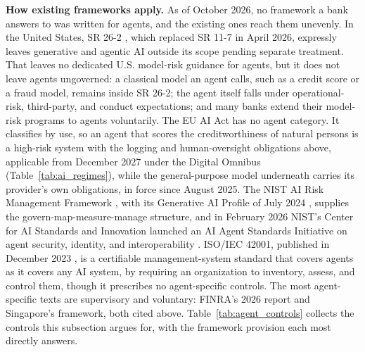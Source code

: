 \documentclass[../ai_in_finance]{subfiles}
\begin{document}
\textbf{How existing frameworks apply.} As of October 2026, no framework a bank answers to was written for agents, and the existing ones reach them unevenly. In the United States, SR 26-2 \parencite{frb2026revised}, which replaced SR 11-7 in April 2026, expressly leaves generative and agentic AI outside its scope pending separate treatment. That leaves no dedicated U.S. model-risk guidance for agents, but it does not leave agents ungoverned: a classical model an agent calls, such as a credit score or a fraud model, remains inside SR 26-2; the agent itself falls under operational-risk, third-party, and conduct expectations; and many banks extend their model-risk programs to agents voluntarily. The EU AI Act \parencite{eu2024aiact} has no agent category. It classifies by use, so an agent that scores the creditworthiness of natural persons is a high-risk system with the logging and human-oversight obligations above, applicable from December 2027 under the Digital Omnibus (Table~\ref{tab:ai_regimes}), while the general-purpose model underneath carries its provider's own obligations, in force since August 2025. The NIST AI Risk Management Framework \parencite{nist2023artificial}, with its Generative AI Profile of July 2024 \parencite{nist2024genai}, supplies the govern-map-measure-manage structure, and in February 2026 NIST's Center for AI Standards and Innovation launched an AI Agent Standards Initiative on agent security, identity, and interoperability \parencite{nist2026agents}. ISO/IEC 42001, published in December 2023 \parencite{iso2023iec42001}, is a certifiable management-system standard that covers agents as it covers any AI system, by requiring an organization to inventory, assess, and control them, though it prescribes no agent-specific controls. The most agent-specific texts are supervisory and voluntary: FINRA's 2026 report and Singapore's framework, both cited above. Table~\ref{tab:agent_controls} collects the controls this subsection argues for, with the framework provision each most directly answers.
\end{document}
